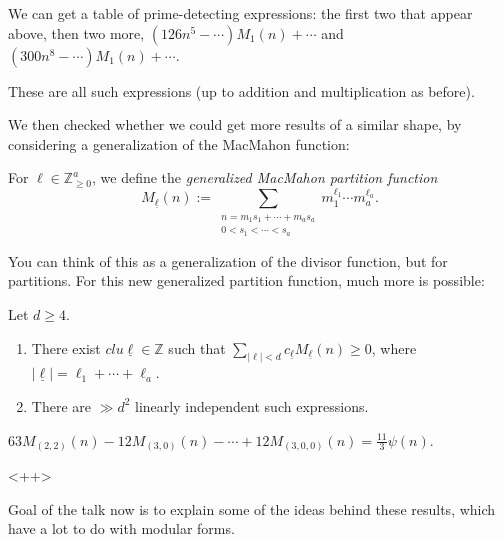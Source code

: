 \documentclass[reqno]{amsart} 
\begin{document}
We can get a table of prime-detecting expressions: the first two that appear above, then two more, $(126 n^5 - \dotsb) M_1(n) + \dotsb$ and $(300 n^8 - \dotsb) M_1(n) + \dotsb$.

\begin{conjecture}
  These are all such expressions (up to addition and multiplication as before).
\end{conjecture}

We then checked whether we could get more results of a similar shape, by considering a generalization of the MacMahon function:
\begin{definition}
  For $\ell \in \mathbb{Z}_{\geq 0}^a$, we define the \emph{generalized MacMahon partition function}
  \begin{equation*}
    M_{\underline{\ell}}(n) := \sum_{
      \substack{
        n = m_1 s_1 + \dotsb + m_a s_a  \\
        0 < s_1 < \dotsb < s_a
      }
    }
    m_1^{\ell_1} \dotsb m_a^{\ell_a}.
  \end{equation*}
\end{definition}
You can think of this as a generalization of the divisor function, but for partitions.  For this new generalized partition function, much more is possible:
\begin{theorem} Let $d \geq 4$.
  \begin{enumerate}
  \item There exist $clu \underline{\ell} \in \mathbb{Z}$ such that $\sum_{\lvert \ell \rvert < d} c_{\underline{\ell}} M_{\underline{\ell}}(n) \geq 0$, where $\lvert \underline{\ell} \rvert = \ell_1 + \dotsb + \ell_a$.
  \item There are $\gg d^2$ linearly independent such expressions.
  \end{enumerate}
\end{theorem}
\begin{example}
  $63 M_{(2, 2)}(n) - 12 M_{(3,0)}(n) - \dotsb + 12 M_{(3,0,0)}(n) = \frac{11}{3} \psi(n)$.
\end{example}<++>

Goal of the talk now is to explain some of the ideas behind these results, which have a lot to do with modular forms.
\end{document}
